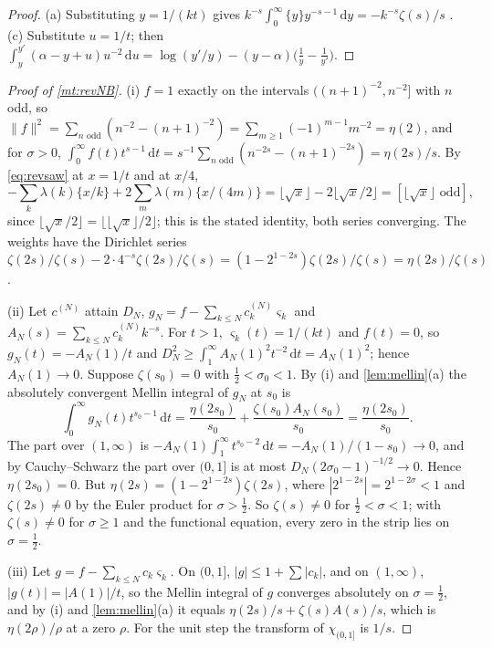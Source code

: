\documentclass[11pt]{article}
\theoremstyle{definition}\newtheorem{definition}[theorem]{Definition}
\theoremstyle{remark}\newtheorem{remark}[theorem]{Remark}
\theoremstyle{definition}\newtheorem{axiom}{Axiom}
\newcommand{\dd}{\,\mathrm d}\newcommand{\e}{\mathrm e}
\newcommand{\fr}[1]{\{#1\}}
\begin{document}
\begin{proof}
(a) Substituting $y=1/(kt)$ gives $k^{-s}\int_0^\infty\fr yy^{-s-1}\dd y=-k^{-s}\zeta(s)/s$ \cite[\S2.1]{Titchmarsh}. (c) Substitute $u=1/t$; then $\int_y^{y'}(\alpha-y+u)u^{-2}\dd u=\log(y'/y)-(y-\alpha)\bigl(\frac1y-\frac1{y'}\bigr)$.
\end{proof}

\begin{proof}[Proof of \cref{mt:revNB}]
(i) $f=1$ exactly on the intervals $((n+1)^{-2},n^{-2}]$ with $n$ odd, so $\|f\|^2=\sum_{n\text{ odd}}(n^{-2}-(n+1)^{-2})=\sum_{m\ge1}(-1)^{m-1}m^{-2}=\eta(2)$, and for $\sigma>0$, $\int_0^\infty f(t)t^{s-1}\dd t=s^{-1}\sum_{n\text{ odd}}(n^{-2s}-(n+1)^{-2s})=\eta(2s)/s$. By \eqref{eq:revsaw} at $x=1/t$ and at $x/4$,
\[
-\sum_k\lambda(k)\fr{x/k}+2\sum_m\lambda(m)\fr{x/(4m)}=\lfloor\sqrt x\rfloor-2\lfloor\sqrt x/2\rfloor=[\lfloor\sqrt x\rfloor\text{ odd}],
\]
since $\lfloor\sqrt x/2\rfloor=\lfloor\lfloor\sqrt x\rfloor/2\rfloor$; this is the stated identity, both series converging. The weights have the Dirichlet series $\zeta(2s)/\zeta(s)-2\cdot4^{-s}\zeta(2s)/\zeta(s)=(1-2^{1-2s})\zeta(2s)/\zeta(s)=\eta(2s)/\zeta(s)$.

(ii) Let $c^{(N)}$ attain $D_N$, $g_N=f-\sum_{k\le N}c^{(N)}_k\varsigma_k$ and $A_N(s)=\sum_{k\le N}c^{(N)}_kk^{-s}$. For $t>1$, $\varsigma_k(t)=1/(kt)$ and $f(t)=0$, so $g_N(t)=-A_N(1)/t$ and $D_N^2\ge\int_1^\infty A_N(1)^2t^{-2}\dd t=A_N(1)^2$; hence $A_N(1)\to0$. Suppose $\zeta(s_0)=0$ with $\frac12<\sigma_0<1$. By (i) and \cref{lem:mellin}(a) the absolutely convergent Mellin integral of $g_N$ at $s_0$ is
\[
\int_0^\infty g_N(t)t^{s_0-1}\dd t=\frac{\eta(2s_0)}{s_0}+\frac{\zeta(s_0)A_N(s_0)}{s_0}=\frac{\eta(2s_0)}{s_0}.
\]
The part over $(1,\infty)$ is $-A_N(1)\int_1^\infty t^{s_0-2}\dd t=-A_N(1)/(1-s_0)\to0$, and by Cauchy--Schwarz the part over $(0,1]$ is at most $D_N(2\sigma_0-1)^{-1/2}\to0$. Hence $\eta(2s_0)=0$. But $\eta(2s)=(1-2^{1-2s})\zeta(2s)$, where $|2^{1-2s}|=2^{1-2\sigma}<1$ and $\zeta(2s)\ne0$ by the Euler product for $\sigma>\frac12$. So $\zeta(s)\ne0$ for $\frac12<\sigma<1$; with $\zeta(s)\ne0$ for $\sigma\ge1$ \cite[\S3.3]{Titchmarsh} and the functional equation, every zero in the strip lies on $\sigma=\frac12$.

(iii) Let $g=f-\sum_{k\le N}c_k\varsigma_k$. On $(0,1]$, $|g|\le1+\sum|c_k|$, and on $(1,\infty)$, $|g(t)|=|A(1)|/t$, so the Mellin integral of $g$ converges absolutely on $\sigma=\frac12$, and by (i) and \cref{lem:mellin}(a) it equals $\eta(2s)/s+\zeta(s)A(s)/s$, which is $\eta(2\rho)/\rho$ at a zero $\rho$. For the unit step the transform of $\chi_{(0,1]}$ is $1/s$.
\end{proof}
\end{document}
